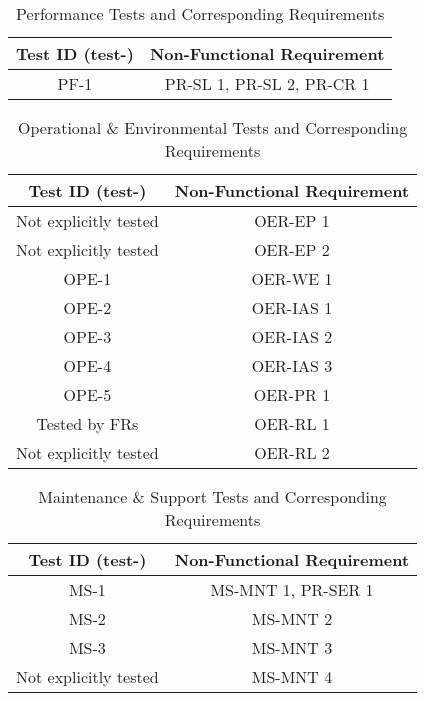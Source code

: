 \documentclass[12pt, titlepage]{article}
\begin{document}
\begin{table}[H]
  \centering
  \caption{Performance Tests and Corresponding Requirements}
  \begin{tabular}{cc}
    \toprule \textbf{Test ID (test-)} & \textbf{Non-Functional Requirement} \\
    \midrule
    PF-1 & PR-SL 1, PR-SL 2, PR-CR 1 \\
    \bottomrule
  \end{tabular}
\end{table}


  \begin{table}[H]
    \centering
    \caption{Operational \& Environmental Tests and Corresponding Requirements}
    \begin{tabular}{cc}
      \toprule \textbf{Test ID (test-)} & \textbf{Non-Functional Requirement} \\
      \midrule
      Not explicitly tested & OER-EP 1 \\
      Not explicitly tested & OER-EP 2 \\
      OPE-1 & OER-WE 1 \\
      OPE-2 & OER-IAS 1 \\
      OPE-3 & OER-IAS 2 \\
      OPE-4 & OER-IAS 3 \\
      OPE-5 & OER-PR 1 \\
      Tested by FRs & OER-RL 1 \\
      Not explicitly tested & OER-RL 2 \\
      \bottomrule
    \end{tabular}
  \end{table}

  \begin{table}[H]
    \centering
    \caption{Maintenance \& Support Tests and Corresponding Requirements}
    \begin{tabular}{cc}
      \toprule \textbf{Test ID (test-)} & \textbf{Non-Functional Requirement} \\
      \midrule
      MS-1 & MS-MNT 1, PR-SER 1 \\
      MS-2 & MS-MNT 2 \\
      MS-3 & MS-MNT 3 \\
      Not explicitly tested & MS-MNT 4 \\
      \bottomrule
    \end{tabular}
  \end{table}
\end{document}

